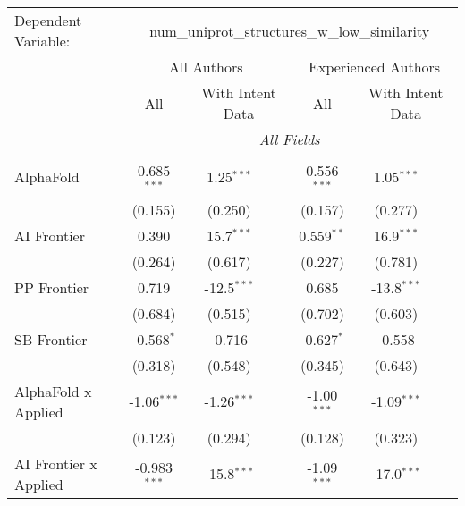 \begingroup
\centering
\begin{tabular}{lcccccc}
   \tabularnewline \midrule \midrule
   Dependent Variable: & \multicolumn{6}{c}{num\_uniprot\_structures\_w\_low\_similarity}\\
 & \multicolumn{3}{c}{All Authors} & \multicolumn{3}{c}{Experienced Authors} \\
\cmidrule(lr){2-4} \cmidrule(lr){5-7}
 & \multicolumn{1}{c}{All} & \multicolumn{2}{c}{With Intent Data} & \multicolumn{1}{c}{All} & \multicolumn{2}{c}{With Intent Data} \\
\cmidrule(lr){2-2} \cmidrule(lr){3-4} \cmidrule(lr){5-5} \cmidrule(lr){6-7}
 & \multicolumn{6}{c}{\textit{All Fields}} \\ \\
   AlphaFold                      & 0.685$^{***}$  & 1.25$^{***}$  &               & 0.556$^{***}$ & 1.05$^{***}$  &   \\   
                                  & (0.155)        & (0.250)       &               & (0.157)       & (0.277)       &   \\   
   AI Frontier                    & 0.390          & 15.7$^{***}$  &               & 0.559$^{**}$  & 16.9$^{***}$  &   \\   
                                  & (0.264)        & (0.617)       &               & (0.227)       & (0.781)       &   \\   
   PP Frontier                    & 0.719          & -12.5$^{***}$ &               & 0.685         & -13.8$^{***}$ &   \\   
                                  & (0.684)        & (0.515)       &               & (0.702)       & (0.603)       &   \\   
   SB Frontier                    & -0.568$^{*}$   & -0.716        &               & -0.627$^{*}$  & -0.558        &   \\   
                                  & (0.318)        & (0.548)       &               & (0.345)       & (0.643)       &   \\   
   AlphaFold x Applied            & -1.06$^{***}$  & -1.26$^{***}$ &               & -1.00$^{***}$ & -1.09$^{***}$ &   \\   
                                  & (0.123)        & (0.294)       &               & (0.128)       & (0.323)       &   \\   
   AI Frontier x Applied          & -0.983$^{***}$ & -15.8$^{***}$ &               & -1.09$^{***}$ & -17.0$^{***}$ &   \\   

\end{tabular}
